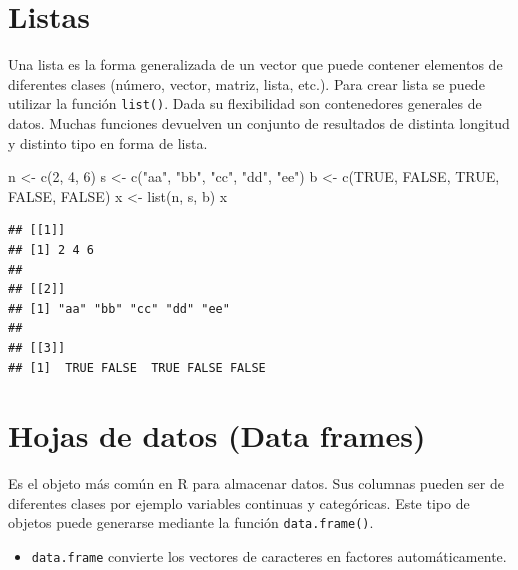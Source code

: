 \documentclass[
]{book}
\newenvironment{Shaded}{\begin{snugshade}}{\end{snugshade}}
\newcommand{\ConstantTok}[1]{\textcolor[rgb]{0.00,0.00,0.00}{#1}}
\newcommand{\DecValTok}[1]{\textcolor[rgb]{0.00,0.00,0.81}{#1}}
\newcommand{\FunctionTok}[1]{\textcolor[rgb]{0.00,0.00,0.00}{#1}}
\newcommand{\NormalTok}[1]{#1}
\newcommand{\OtherTok}[1]{\textcolor[rgb]{0.56,0.35,0.01}{#1}}
\newcommand{\StringTok}[1]{\textcolor[rgb]{0.31,0.60,0.02}{#1}}
\newenvironment{rmdblock}[1]
{\begin{shaded*}
		\begin{itemize}
			\renewcommand{\labelitemi}{
				\raisebox{-.7\height}[0pt][0pt]{
					{\setkeys{Gin}{width=3em,keepaspectratio}\texttt{[image: images/\#1]}}
				}
			}
			\item
		}
		{
		\end{itemize}
	\end{shaded*}
}
\newenvironment{rmdnote}
{\begin{rmdblock}{note}}
	{\end{rmdblock}}
\begin{document}
\hypertarget{listas}{%
\section{Listas}\label{listas}}

Una lista es la forma generalizada de un vector que puede contener elementos de diferentes clases (número, vector, matriz, lista, etc.). Para crear lista se puede utilizar la función \texttt{list()}. Dada su flexibilidad son contenedores generales de datos. Muchas funciones devuelven un conjunto de resultados de distinta longitud y distinto tipo en forma de lista.

\begin{Shaded}
\begin{Highlighting}[]
\NormalTok{n }\OtherTok{\textless{}{-}}  \FunctionTok{c}\NormalTok{(}\DecValTok{2}\NormalTok{, }\DecValTok{4}\NormalTok{, }\DecValTok{6}\NormalTok{)}
\NormalTok{s }\OtherTok{\textless{}{-}}  \FunctionTok{c}\NormalTok{(}\StringTok{"aa"}\NormalTok{, }\StringTok{"bb"}\NormalTok{, }\StringTok{"cc"}\NormalTok{, }\StringTok{"dd"}\NormalTok{, }\StringTok{"ee"}\NormalTok{)}
\NormalTok{b }\OtherTok{\textless{}{-}}  \FunctionTok{c}\NormalTok{(}\ConstantTok{TRUE}\NormalTok{, }\ConstantTok{FALSE}\NormalTok{, }\ConstantTok{TRUE}\NormalTok{, }\ConstantTok{FALSE}\NormalTok{, }\ConstantTok{FALSE}\NormalTok{)}
\NormalTok{x }\OtherTok{\textless{}{-}}  \FunctionTok{list}\NormalTok{(n, s, b)}
\NormalTok{x}
\end{Highlighting}
\end{Shaded}

\begin{verbatim}
## [[1]]
## [1] 2 4 6
## 
## [[2]]
## [1] "aa" "bb" "cc" "dd" "ee"
## 
## [[3]]
## [1]  TRUE FALSE  TRUE FALSE FALSE
\end{verbatim}

\hypertarget{hojas-de-datos-data-frames}{%
\section{Hojas de datos (Data frames)}\label{hojas-de-datos-data-frames}}

Es el objeto más común en R para almacenar datos. Sus columnas pueden ser de diferentes clases por ejemplo variables continuas y categóricas. Este tipo de objetos puede generarse mediante la función \texttt{data.frame()}.

\begin{rmdnote}
\texttt{data.frame} convierte los vectores de caracteres en factores
automáticamente.
\end{rmdnote}
\end{document}
